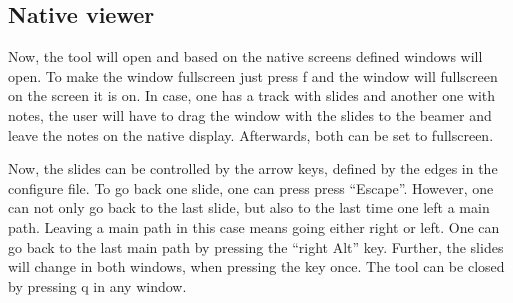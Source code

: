     \subsection{Native viewer}
    Now, the tool will open and based on the native screens defined windows will open.
    To make the window fullscreen just press f and the window will fullscreen on the screen it is on.
    In case, one has a track with slides and another one with notes, the user will have to drag the window with the slides to the beamer and leave the notes on the native display.
    Afterwards, both can be set to fullscreen.
    
    Now, the slides can be controlled by the arrow keys, defined by the edges in the configure file.
    To go back one slide, one can press press ``Escape''.
    However, one can not only go back to the last slide, but also to the last time one left a main path.
    Leaving a main path in this case means going either right or left.
    One can go back to the last main path by pressing the ``right Alt'' key.
    Further, the slides will change in both windows, when pressing the key once.
    The tool can be closed by pressing q in any window. 